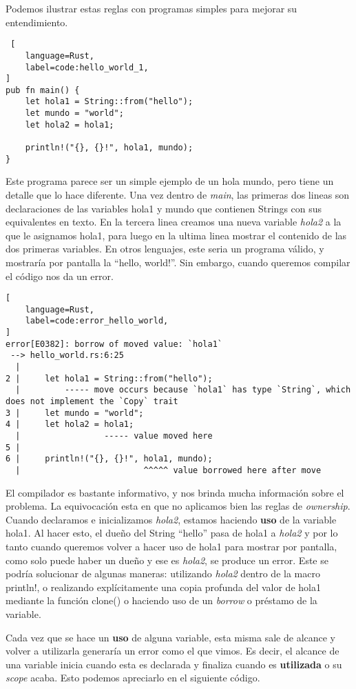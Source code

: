 Podemos ilustrar estas reglas con programas simples para mejorar su entendimiento.
\begin{lstlisting} [
    language=Rust,
    label=code:hello_world_1,
]
pub fn main() {
    let hola1 = String::from("hello");
    let mundo = "world";
    let hola2 = hola1;

    println!("{}, {}!", hola1, mundo);
}
\end{lstlisting}

Este programa parece ser un simple ejemplo de un hola mundo, pero tiene un detalle que lo hace diferente. Una vez dentro de \textit{main}, las primeras dos lineas son declaraciones de las variables hola1 y mundo que contienen Strings con sus equivalentes en texto. En la tercera linea creamos una nueva variable \textit{hola2} a la que le asignamos hola1, para luego en la ultima linea mostrar el contenido de las dos primeras variables. En otros lenguajes, este seria un programa válido, y mostraría por pantalla la ``hello, world!''. Sin embargo, cuando queremos compilar el código nos da un error.

\begin{lstlisting}[
    language=Rust,
    label=code:error_hello_world,
]
error[E0382]: borrow of moved value: `hola1`
 --> hello_world.rs:6:25
  |
2 |     let hola1 = String::from("hello");
  |         ----- move occurs because `hola1` has type `String`, which does not implement the `Copy` trait
3 |     let mundo = "world";
4 |     let hola2 = hola1;
  |                 ----- value moved here
5 |
6 |     println!("{}, {}!", hola1, mundo);
  |                         ^^^^^ value borrowed here after move
\end{lstlisting}

El compilador es bastante informativo, y nos brinda mucha información sobre el problema. La equivocación esta en que no aplicamos bien las reglas de \textit{ownership}. Cuando declaramos e inicializamos \textit{hola2}, estamos haciendo \textbf{uso} de la variable hola1. Al hacer esto, el dueño del String ``hello'' pasa de hola1 a \textit{hola2} y por lo tanto cuando queremos volver a hacer uso de hola1 para mostrar por pantalla, como solo puede haber un dueño y ese es \textit{hola2}, se produce un error. Este se podría solucionar de algunas maneras: utilizando \textit{hola2} dentro de la macro println!, o realizando explícitamente una copia profunda del valor de hola1 mediante la función clone() o haciendo uso de un \textit{borrow} o préstamo de la variable.

Cada vez que se hace un \textbf{uso} de alguna variable, esta misma sale de alcance y volver a utilizarla generaría un error como el que vimos. Es decir, el alcance de una variable inicia cuando esta es declarada y finaliza cuando es \textbf{utilizada} o su \textit{scope} acaba. Esto podemos apreciarlo en el siguiente código.

